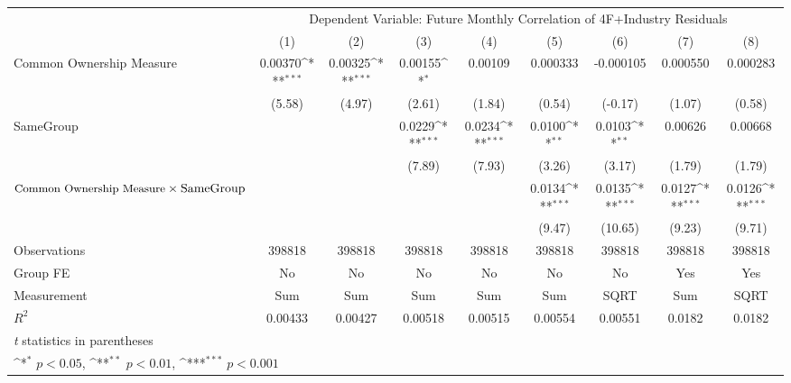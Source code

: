 {
\def\sym#1{\ifmmode^{#1}\else\(^{#1}\)\fi}
\begin{tabular}{l*{8}{c}}
\hline\hline
                &\multicolumn{8}{c}{Dependent Variable: Future Monthly Correlation of 4F+Industry Residuals}                                                            \\\cmidrule(lr){2-9}
                &\multicolumn{1}{c}{(1)}         &\multicolumn{1}{c}{(2)}         &\multicolumn{1}{c}{(3)}         &\multicolumn{1}{c}{(4)}         &\multicolumn{1}{c}{(5)}         &\multicolumn{1}{c}{(6)}         &\multicolumn{1}{c}{(7)}         &\multicolumn{1}{c}{(8)}         \\
\hline
Common Ownership Measure&  0.00370\sym{***}&  0.00325\sym{***}&  0.00155\sym{*}  &  0.00109         & 0.000333         &-0.000105         & 0.000550         & 0.000283         \\
                &   (5.58)         &   (4.97)         &   (2.61)         &   (1.84)         &   (0.54)         &  (-0.17)         &   (1.07)         &   (0.58)         \\
[1em]
SameGroup       &                  &                  &   0.0229\sym{***}&   0.0234\sym{***}&   0.0100\sym{**} &   0.0103\sym{**} &  0.00626         &  0.00668         \\
                &                  &                  &   (7.89)         &   (7.93)         &   (3.26)         &   (3.17)         &   (1.79)         &   (1.79)         \\
[1em]
 $ \text{\small Common Ownership Measure} \times {\text{SameGroup} }$ &                  &                  &                  &                  &   0.0134\sym{***}&   0.0135\sym{***}&   0.0127\sym{***}&   0.0126\sym{***}\\
                &                  &                  &                  &                  &   (9.47)         &  (10.65)         &   (9.23)         &   (9.71)         \\
\hline
Observations    &   398818         &   398818         &   398818         &   398818         &   398818         &   398818         &   398818         &   398818         \\
Group FE        &       No         &       No         &       No         &       No         &       No         &       No         &      Yes         &      Yes         \\
Measurement     &      Sum         &      Sum         &      Sum         &      Sum         &      Sum         &     SQRT         &      Sum         &     SQRT         \\
$ R^2 $         &  0.00433         &  0.00427         &  0.00518         &  0.00515         &  0.00554         &  0.00551         &   0.0182         &   0.0182         \\
\hline\hline
\multicolumn{9}{l}{\footnotesize \textit{t} statistics in parentheses}\\
\multicolumn{9}{l}{\footnotesize \sym{*} \(p<0.05\), \sym{**} \(p<0.01\), \sym{***} \(p<0.001\)}\\
\end{tabular}
}
